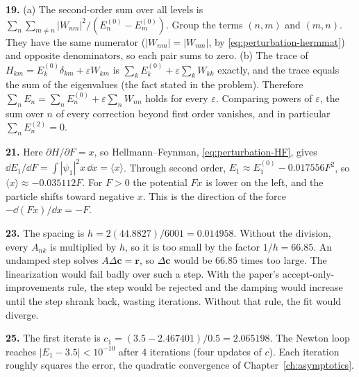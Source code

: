 \textbf{19.} (a) The second-order sum over all levels is $\sum_n\sum_{m\ne n}|W_{nm}|^2/(E_n^{(0)}-E_m^{(0)})$. Group the terms $(n,m)$ and $(m,n)$. They have the same numerator ($|W_{nm}|=|W_{mn}|$, by \cref{eq:perturbation-hermmat}) and opposite denominators, so each pair sums to zero. (b) The trace of $H_{km}=E_k^{(0)}\delta_{km}+\varepsilon W_{km}$ is $\sum_kE_k^{(0)}+\varepsilon\sum_kW_{kk}$ exactly, and the trace equals the sum of the eigenvalues (the fact stated in the problem). Therefore $\sum_nE_n=\sum_nE_n^{(0)}+\varepsilon\sum_nW_{nn}$ holds for every $\varepsilon$. Comparing powers of $\varepsilon$, the sum over $n$ of every correction beyond first order vanishes, and in particular $\sum_nE_n^{(2)}=0$.

\textbf{21.} Here $\partial H/\partial F=x$, so Hellmann--Feynman, \cref{eq:perturbation-HF}, gives $\dd E_1/\dd F=\int|\psi_1|^2x\,\dd x=\langle x\rangle$. Through second order, $E_1\approx E_1^{(0)}-0.017556F^2$, so $\langle x\rangle\approx-0.035112F$. For $F>0$ the potential $Fx$ is lower on the left, and the particle shifts toward negative $x$. This is the direction of the force $-\dd(Fx)/\dd x=-F$.

\textbf{23.} The spacing is $h=2(44.8827)/6001=0.014958$. Without the division, every $A_{nk}$ is multiplied by $h$, so it is too small by the factor $1/h=66.85$. An undamped step solves $A\Delta\bm c=\bm r$, so $\Delta\bm c$ would be $66.85$ times too large. The linearization would fail badly over such a step. With the paper's accept-only-improvements rule, the step would be rejected and the damping would increase until the step shrank back, wasting iterations. Without that rule, the fit would diverge.

\textbf{25.} The first iterate is $c_1=(3.5-2.467401)/0.5=2.065198$. The Newton loop reaches $|E_1-3.5|<10^{-10}$ after 4 iterations (four updates of $c$). Each iteration roughly squares the error, the quadratic convergence of Chapter~\ref{ch:asymptotics}.
